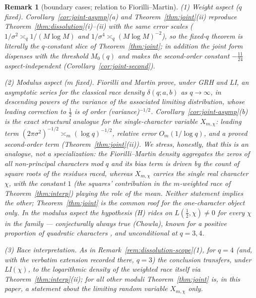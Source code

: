 \documentclass[11pt]{article}
\newtheorem{remark}{Remark}
\begin{document}
\begin{remark}[boundary cases; relation to Fiorilli--Martin]
\label{rem:joint-fm}
(1) \emph{Weight aspect} ($q$ fixed). Corollary~\ref{cor:joint-asymp}(a)
and Theorem~\ref{thm:joint}(ii) reproduce
Theorem~\ref{thm:dissolution}(i)--(ii) with the same error scales
($1/\sigma^2\asymp_q1/(M\log M)$ and
$1/\sigma^4\asymp_q(M\log M)^{-2}$), so the fixed-$q$ theorem is
literally the $q$-constant slice of Theorem~\ref{thm:joint}; in
addition the joint form dispenses with the threshold $M_0(q)$ and
makes the second-order constant $-\tfrac{11}{24}$ aspect-independent
(Corollary~\ref{cor:joint-second}).

(2) \emph{Modulus aspect} ($m$ fixed). Fiorilli and Martin \cite{FM13}
prove, under GRH and LI, an asymptotic series for the classical race
density $\delta(q;a,b)$ as $q\to\infty$, in descending powers of the
variance of the associated limiting distribution, whose leading
correction to $\tfrac12$ is of order (variance)$^{-1/2}$.
Corollary~\ref{cor:joint-asymp}(b) is the exact structural analogue
for the single-character variable $X_{m,\chi}$: leading term
$(2\pi\sigma^2)^{-1/2}\asymp_m(\log q)^{-1/2}$, relative error
$O_m(1/\log q)$, and a proved second-order term
(Theorem~\ref{thm:joint}(ii)). We stress, honestly, that this is an
\emph{analogue, not a specialization}: the Fiorilli--Martin density
aggregates the zeros of \emph{all} non-principal characters mod $q$
and its bias term is driven by the count of square roots of the
residues raced, whereas $X_{m,\chi}$ carries the single real character
$\chi$, with the constant $1$ (the squares' contribution in the
$m$-weighted race of Theorem~\ref{thm:interp}) playing the role of the
mean. Neither statement implies the other; Theorem~\ref{thm:joint} is
the common roof for the one-character object only. In the modulus
aspect the hypothesis (H) rides on $L(\tfrac12,\chi)\ne0$ for every
$\chi$ in the family --- conjecturally always true (Chowla), known for
a positive proportion of quadratic characters \cite{Sou00}, and
unconditional at $q=3,4$.

(3) \emph{Race interpretation.} As in
Remark~\ref{rem:dissolution-scope}(1), for $q=4$ (and, with the
verbatim extension recorded there, $q=3$) the conclusion transfers,
under LI$(\chi)$, to the logarithmic density of the weighted race
itself via Theorem~\ref{thm:interp}(ii); for all other moduli
Theorem~\ref{thm:joint} is, in this paper, a statement about the
limiting random variable $X_{m,\chi}$ only.
\end{remark}
\end{document}
